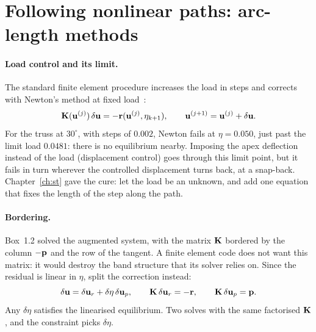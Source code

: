 
\section{Following nonlinear paths: arc-length methods}\label{sec:nc-riks}
%

\paragraph{Load control and its limit.}
The standard finite element procedure increases the load in steps and corrects with
Newton's method at fixed load~\cite[slides~4 and~6]{nc-triantafyllidis2018}:
\begin{equation}\label{eq:nc-newton}
  \mathbf{K}(\mathbf{u}^{(j)})\,\delta\mathbf{u} = -\mathbf{r}(\mathbf{u}^{(j)},\eta_{k+1}),
  \qquad \mathbf{u}^{(j+1)} = \mathbf{u}^{(j)} + \delta\mathbf{u} .
\end{equation}
For the truss at $30^\circ$, with steps of $0.002$, Newton fails at $\eta = 0.050$, just
past the limit load $0.0481$: there is no equilibrium nearby. Imposing the apex
deflection instead of the load (displacement control) goes through this limit point,
but it fails in turn wherever the controlled displacement turns back, at a snap-back.
Chapter~\ref{ch:st} gave the cure: let the load be an unknown, and add one equation that
fixes the length of the step along the path.

\paragraph{Bordering.}
%
Box~1.2 solved the augmented system, with the matrix $\mathbf{K}$ bordered by the column
$-\mathbf{p}$ and the row of the tangent. A finite element code does not want this matrix: it
would destroy the band structure that its solver relies on. Since the residual is linear
in $\eta$, split the correction instead:
\begin{equation}\label{eq:nc-bordering}
  \delta\mathbf{u} = \delta\mathbf{u}_r + \delta\eta\,\delta\mathbf{u}_p,
  \qquad
  \mathbf{K}\,\delta\mathbf{u}_r = -\mathbf{r},
  \qquad
  \mathbf{K}\,\delta\mathbf{u}_p = \mathbf{p} .
\end{equation}
Any $\delta\eta$ satisfies the linearised equilibrium. Two solves with the same
factorised $\mathbf{K}$, and the constraint picks $\delta\eta$.

